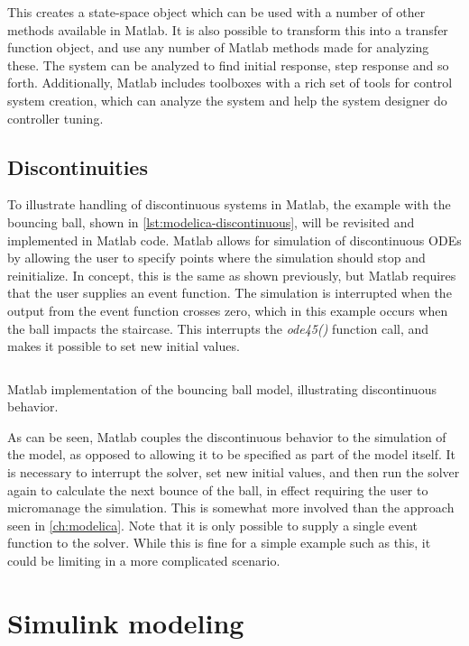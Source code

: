 \documentclass[\rootfolder/main.tex]{subfiles}
\begin{document}
This creates a state-space object which can be used with a number of other methods available in Matlab.
It is also possible to transform this into a transfer function object, and use any number of Matlab methods made for analyzing these.
The system can be analyzed to find initial response, step response and so forth.
Additionally, Matlab includes toolboxes with a rich set of tools for control system creation, which can analyze the system and help the system designer do controller tuning.

\subsection{Discontinuities}

To illustrate handling of discontinuous systems in Matlab, the example with the bouncing ball, shown in \cref{lst:modelica-discontinuous}, will be revisited and implemented in Matlab code.
Matlab allows for simulation of discontinuous ODEs by allowing the user to specify points where the simulation should stop and reinitialize.
In concept, this is the same as shown previously, but Matlab requires that the user supplies an event function.
The simulation is interrupted when the output from the event function crosses zero, which in this example occurs when the ball impacts the staircase.
This interrupts the \emph{ode45()} function call, and makes it possible to set new initial values.

\begin{listing}[ht]
    \inputminted{matlab}{\rootfolder/Models/Matlab/BouncingBall.m}
    \caption{Matlab implementation of the bouncing ball model, illustrating discontinuous behavior.\label{lst:matlab-discontinuous}}
\end{listing}

As can be seen, Matlab couples the discontinuous behavior to the simulation of the model, as opposed to allowing it to be specified as part of the model itself.
It is necessary to interrupt the solver, set new initial values, and then run the solver again to calculate the next bounce of the ball, in effect requiring the user to micromanage the simulation.
This is somewhat more involved than the approach seen in \cref{ch:modelica}.
Note that it is only possible to supply a single event function to the solver.
While this is fine for a simple example such as this, it could be limiting in a more complicated scenario.

\section{Simulink modeling}
\end{document}
